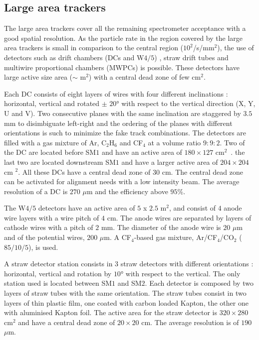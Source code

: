 \subsection{Large area trackers}

The large area trackers cover all the remaining spectrometer acceptance with a good spatial resolution. As the particle rate in the region covered by the large area trackers is small in comparison to the central region ($10^2$/s/mm$^2$), the use of detectors such as drift chambers (DCs and W$4/5$) \cite{DaCosta}, straw drift tubes \cite{Zvyagin} and multiwire proportional chambers (MWPCs) is possible. These detectors have large active size area ($\sim$ m$^2$) with a central dead zone of few cm$^2$.

Each DC consists of eight layers of wires with four different inclinations : horizontal, vertical and rotated $\pm$ $20$° with respect to the vertical direction (X, Y, U and V). Two consecutive planes with the same inclination are staggered by $3.5$ mm to disimbiguate left-right and the ordering of the planes with different orientations is such to minimize the fake track combinations. The detectors are filled with a gas mixture of Ar, C$_2$H$_6$ and CF$_4$ at a volume ratio $9:9:2$. Two of the DC are located before SM$1$ and have an active area of $180 \times 127$ cm$^2$~. the last two are located downstream SM$1$ and have a larger active area of $204 \times 204$ cm $^2$. All these DCs have a central dead zone of $30$ cm. The central dead zone can be activated for alignment needs with a low intensity beam. The average resolution of a DC is $270$ $\mu$m and the efficiency above $95$\%.

The W$4/5$ detectors have an active area of $5$ x $2.5$ m$^2$, and consist of $4$ anode wire layers with a wire pitch of $4$ cm. The anode wires are separated by layers of cathode wires with a pitch of $2$ mm. The diameter of the anode wire is $20$ $\mu$m and of the potential wires, $200$ $\mu$m. A CF$_4$-based gas mixture, Ar/CF$_4$/CO$_2$ ($85/10/5$), is used.

A straw detector station consists in $3$ straw detectors with different orientations : horizontal, vertical and rotation by $10$° with respect to the vertical. The only station used is located between SM$1$ and SM$2$. Each detector is composed by two layers of straw tubes with the same orientation. The straw tubes consist in two layers of thin plastic film, one coated with carbon loaded Kapton, the other one with aluminised Kapton foil. The active area for the straw detector is $320 \times 280$ cm$^2$ and have a central dead zone of $20 \times 20$ cm. The average resolution is of $190$ $\mu$m.

